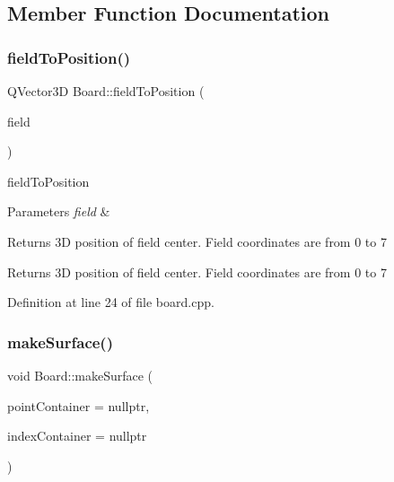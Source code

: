 \subsection{Member Function Documentation}
\mbox{\label{class_board_a15ff6efe6bd967a60f6b12ce59e5c27a}} 
\subsubsection{\texorpdfstring{fieldToPosition()}{fieldToPosition()}}
{\footnotesize\ttfamily Q\+Vector3D Board\+::field\+To\+Position (\begin{DoxyParamCaption}\item[{Q\+Point}]{field }\end{DoxyParamCaption})}



field\+To\+Position 


\begin{DoxyParams}{Parameters}
{\em field} & \\
\hline
\end{DoxyParams}
\begin{DoxyReturn}{Returns}
3D position of field center. Field coordinates are from 0 to 7
\end{DoxyReturn}
Returns 3D position of field center. Field coordinates are from 0 to 7 

Definition at line 24 of file board.\+cpp.

\mbox{\label{class_board_a4a8568ce7d13db61b01e6bf14e7b12fd}} 
\subsubsection{\texorpdfstring{makeSurface()}{makeSurface()}}
{\footnotesize\ttfamily void Board\+::make\+Surface (\begin{DoxyParamCaption}\item[{Q\+Vector$<$ \mbox{\hyperlink{class_g_l_point}{G\+L\+Point}} $>$ $\ast$}]{point\+Container = {\ttfamily nullptr},  }\item[{Q\+Vector$<$ Index\+Type $>$ $\ast$}]{index\+Container = {\ttfamily nullptr} }\end{DoxyParamCaption})\hspace{0.3cm}{\ttfamily [virtual]}}




